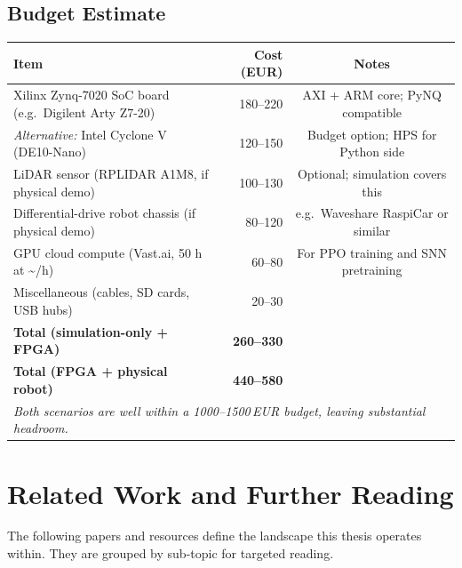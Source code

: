 \documentclass[11pt,a4paper]{article}
\begin{document}
\subsection{Budget Estimate}

\begin{center}
\renewcommand{\arraystretch}{1.3}
\begin{tabular}{@{}lrc@{}}
  \toprule
  \textbf{Item} & \textbf{Cost (EUR)} & \textbf{Notes} \\
  \midrule
  Xilinx Zynq-7020 SoC board (e.g.\ Digilent Arty Z7-20) & 180--220 &
    AXI + ARM core; PyNQ compatible \\
  \textit{Alternative:} Intel Cyclone V (DE10-Nano) & 120--150 &
    Budget option; HPS for Python side \\
  LiDAR sensor (RPLIDAR A1M8, if physical demo) & 100--130 &
    Optional; simulation covers this \\
  Differential-drive robot chassis (if physical demo) & 80--120 &
    e.g.\ Waveshare RaspiCar or similar \\
  GPU cloud compute (Vast.ai, 50 h at \textasciitilde\texteuro1.2/h) & 60--80 &
    For PPO training and SNN pretraining \\
  Miscellaneous (cables, SD cards, USB hubs) & 20--30 & \\
  \midrule
  \textbf{Total (simulation-only + FPGA)} & \textbf{260--330} & \\
  \textbf{Total (FPGA + physical robot)} & \textbf{440--580} & \\
  \midrule
  \multicolumn{3}{l}{\textit{Both scenarios are well within a 1000--1500\,EUR budget,
    leaving substantial headroom.}} \\
  \bottomrule
\end{tabular}
\end{center}

\section{Related Work and Further Reading}

The following papers and resources define the landscape this thesis operates within.
They are grouped by sub-topic for targeted reading.
\end{document}
